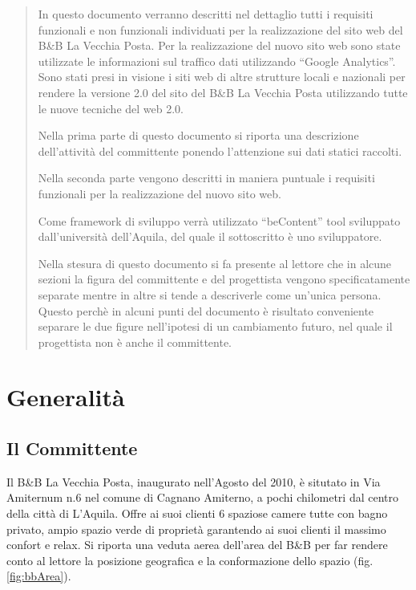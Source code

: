 \documentclass[a4paper,12pt,hidelinks]{report}
\begin{document}
\begin{abstract}
  In questo documento verranno descritti nel dettaglio tutti i requisiti funzionali e non funzionali individuati per la realizzazione del sito web del B\&B La Vecchia Posta.
  Per la realizzazione del nuovo sito web sono state utilizzate le informazioni sul traffico dati utilizzando ``Google Analytics''. Sono stati presi in visione i siti web di altre strutture
  locali e nazionali per rendere la versione 2.0 del sito del B\&B La Vecchia Posta utilizzando tutte le nuove tecniche del web 2.0.
  \par Nella prima parte di questo documento si riporta una descrizione dell'attività del committente ponendo l'attenzione sui dati statici raccolti.
  \par Nella seconda parte vengono descritti in maniera puntuale i requisiti funzionali per la realizzazione del nuovo sito web.
  \par Come framework di sviluppo verrà utilizzato ``beContent'' tool sviluppato dall'università dell'Aquila, del quale il sottoscritto è uno sviluppatore.
  \par Nella stesura di questo documento si fa presente al lettore che in alcune sezioni la figura del committente e del progettista vengono specificatamente separate mentre in altre si tende a 
  descriverle come un'unica persona. Questo perchè in alcuni punti del documento è risultato conveniente separare le due figure nell'ipotesi di un cambiamento futuro, nel quale il progettista 
  non è anche il committente.
\end{abstract}

\chapter{Generalità}

\section{Il Committente}
  Il B\&B La Vecchia Posta, inaugurato nell'Agosto del 2010, è situtato in Via Amiternum n.6 nel comune di Cagnano Amiterno, a pochi chilometri dal centro della città di L'Aquila.
  Offre ai suoi clienti 6 spaziose camere tutte con bagno privato, ampio spazio verde di proprietà garantendo ai suoi clienti il massimo confort e relax. 
  Si riporta una veduta aerea dell'area del B\&B per far rendere conto al lettore la posizione geografica e la conformazione dello spazio (fig.\ref{fig:bbArea}). 
\end{document}
